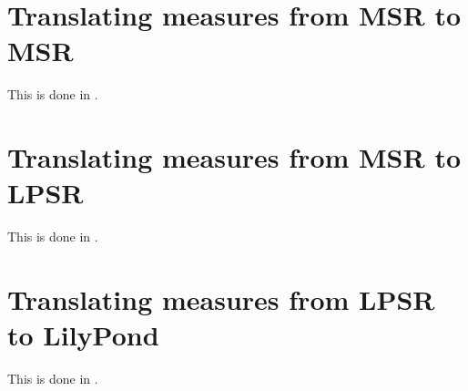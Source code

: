 \section{Translating measures from MSR to MSR}

This is done in \msrToMsr{}.


\section{Translating measures from MSR to LPSR}

This is done in \msrToLpsr{}.


\section{Translating measures from LPSR to LilyPond}

This is done in \lpsrToLilypond{}.



